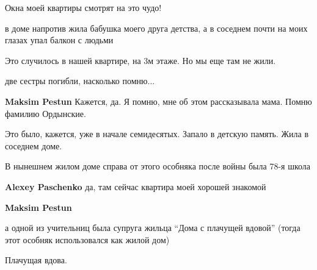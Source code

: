  
 
 
 
 

Окна моей квартиры смотрят на это чудо!

в доме напротив жила бабушка моего друга детства, а в соседнем почти на моих глазах упал балкон с людьми

Это случилось в нашей квартире, на 3м этаже. Но мы еще там не жили.

две сестры погибли, насколько помню...

\textbf{Maksim Pestun} Кажется, да. Я помню, мне об этом рассказывала мама. Помню фамилию Ордынские.

Это было, кажется, уже в начале семидесятых. Запало в детскую память. Жила в соседнем доме.

В нынешнем жилом доме справа от этого особняка после войны была 78-я школа

\textbf{Alexey Paschenko} да, там сейчас квартира моей хорошей знакомой

\textbf{Maksim Pestun} 

а одной из учительниц была супруга жильца \enquote{Дома с плачущей вдовой}
(тогда этот особняк использовался как жилой дом)


Плачущая вдова.
